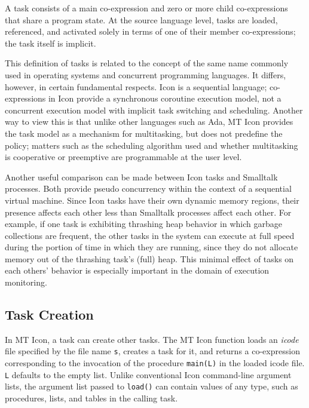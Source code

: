 A task consists of a main co-expression and zero or more child
co-expressions that share a program state.  At the source language
level, tasks are loaded, referenced, and activated solely in terms of
one of their member co-expressions; the task itself is implicit.

This definition of tasks is related to the concept of the same name
commonly used in operating systems and concurrent programming
languages.  It differs, however, in certain fundamental respects.
Icon is a sequential language; co-expressions in Icon provide a
synchronous coroutine execution model, not a concurrent execution
model with implicit task switching and scheduling.  Another way to
view this is that unlike other languages such as Ada, MT Icon provides
the task model as a mechanism for multitasking, but does not
predefine the policy; matters such as the scheduling algorithm used
and whether multitasking is cooperative or preemptive are
programmable at the user level.

Another useful comparison can be made between Icon tasks and Smalltalk
processes.  Both provide pseudo concurrency within the context of a
sequential virtual machine.  Since Icon tasks have their own dynamic
memory regions, their presence affects each other less than
Smalltalk processes affect each other.  For example, if one task is
exhibiting thrashing heap behavior in which garbage collections are
frequent, the other tasks in the system can execute at full speed
during the portion of time in which they are running, since they
do not allocate memory out of the thrashing task's (full) heap.
This minimal effect of tasks on each others' behavior is especially
important in the domain of execution monitoring.


\subsection{Task Creation}

In MT Icon, a task can create other tasks.  The MT Icon function
\noindent loads an {\em icode\/} file \cite{Griswold86} specified by
the file name {\tt s}, creates a task for it, and returns a
co-expression corresponding to the invocation of the procedure
{\tt main(L)} in the loaded icode file. {\tt L} defaults to the empty list.
Unlike conventional Icon command-line argument lists, the argument list
passed to {\tt load()} can contain values of any type, such as procedures,
lists, and tables in the calling task.

